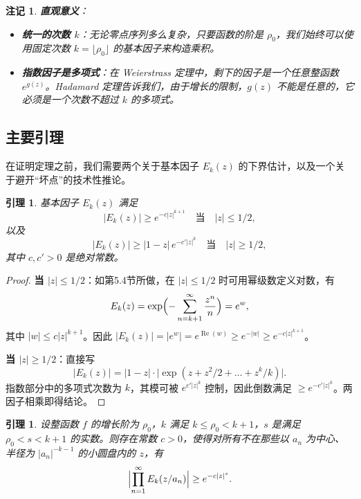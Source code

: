 \documentclass[UTF8]{ctexart}
\newtheorem{lemma}[theorem]{引理}
\newtheorem{remark}{注记}[section]
\numberwithin{equation}{section}
\begin{document}
\begin{remark}
\textbf{直观意义}：
\begin{itemize}
\item \textbf{统一的次数 \(k\)}：无论零点序列多么复杂，只要函数的阶是 \(\rho_0\)，我们始终可以使用固定次数 \(k = \lfloor \rho_0 \rfloor\) 的基本因子来构造乘积。
\item \textbf{指数因子是多项式}：在 Weierstrass 定理中，剩下的因子是一个任意整函数 \(e^{g(z)}\)。Hadamard 定理告诉我们，由于增长的限制，\(g(z)\) 不能是任意的，它必须是一个次数不超过 \(k\) 的多项式。
\end{itemize}
\end{remark}

\subsection{主要引理}

在证明定理之前，我们需要两个关于基本因子 \(E_k(z)\) 的下界估计，以及一个关于避开“坏点”的技术性推论。

\begin{lemma}\label{lem:Ek-lower}
基本因子 \(E_k(z)\) 满足
\begin{equation}
|E_k(z)| \ge e^{-c |z|^{k+1}} \quad \text{当} \quad |z| \le 1/2,
\end{equation}
以及
\begin{equation}
|E_k(z)| \ge |1 - z| \, e^{-c' |z|^k} \quad \text{当} \quad |z| \ge 1/2,
\end{equation}
其中 \(c, c' > 0\) 是绝对常数。
\end{lemma}

\begin{proof}
\textbf{当 \(|z| \le 1/2\)}：如第5.4节所做，在 \(|z| \le 1/2\) 时可用幂级数定义对数，有
\[
E_k(z) = \exp\Bigl( -\sum_{n=k+1}^\infty \frac{z^n}{n} \Bigr) = e^w,
\]
其中 \(|w| \le c |z|^{k+1}\)。因此 \(|E_k(z)| = |e^w| = e^{\operatorname{Re}(w)} \ge e^{-|w|} \ge e^{-c|z|^{k+1}}\)。

\textbf{当 \(|z| \ge 1/2\)}：直接写
\[
|E_k(z)| = |1 - z| \cdot \bigl|\exp(z + z^2/2 + \dots + z^k/k)\bigr|.
\]
指数部分中的多项式次数为 \(k\)，其模可被 \(e^{c'|z|^k}\) 控制，因此倒数满足 \(\ge e^{-c'|z|^k}\)。两因子相乘即得结论。
\end{proof}

\begin{lemma}\label{lem:prod-lower}
设整函数 \(f\) 的增长阶为 \(\rho_0\)，\(k\) 满足 \(k \le \rho_0 < k+1\)，\(s\) 是满足 \(\rho_0 < s < k+1\) 的实数。则存在常数 \(c > 0\)，使得对所有不在那些以 \(a_n\) 为中心、半径为 \(|a_n|^{-k-1}\) 的小圆盘内的 \(z\)，有
\[
\Bigl| \prod_{n=1}^\infty E_k(z/a_n) \Bigr| \ge e^{-c|z|^s}.
\]
\end{lemma}
\end{document}
